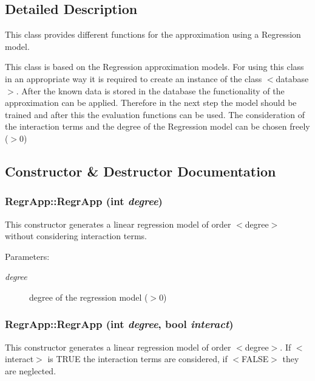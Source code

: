 \subsection{Detailed Description}
This class provides different functions for the approximation using a Regression model. 

This class is based on the Regression approximation models. For using this class in an appropriate way it is required to create an instance of the class $<$database$>$. After the known data is stored in the database the functionality of the approximation can be applied. Therefore in the next step the model should be trained and after this the evaluation functions can be used. The consideration of the interaction terms and the degree of the Regression model can be chosen freely ($>$0) 



\subsection{Constructor \& Destructor Documentation}
\subsubsection{\setlength{\rightskip}{0pt plus 5cm}Regr\-App::Regr\-App (int {\em degree})}\label{classRegrApp_750cfd3cf6881ece0f0a2e50e54dfd8a}


This constructor generates a linear regression model of order $<$degree$>$ without considering interaction terms. 

\begin{Desc}
\item[Parameters:]
\begin{description}
\item[{\em degree}]degree of the regression model ($>$0) \end{description}
\end{Desc}
\subsubsection{\setlength{\rightskip}{0pt plus 5cm}Regr\-App::Regr\-App (int {\em degree}, bool {\em interact})}\label{classRegrApp_cde25206c40d6a50d3660bac57c226f5}


This constructor generates a linear regression model of order $<$degree$>$. If $<$interact$>$ is TRUE the interaction terms are considered, if $<$FALSE$>$ they are neglected. 

